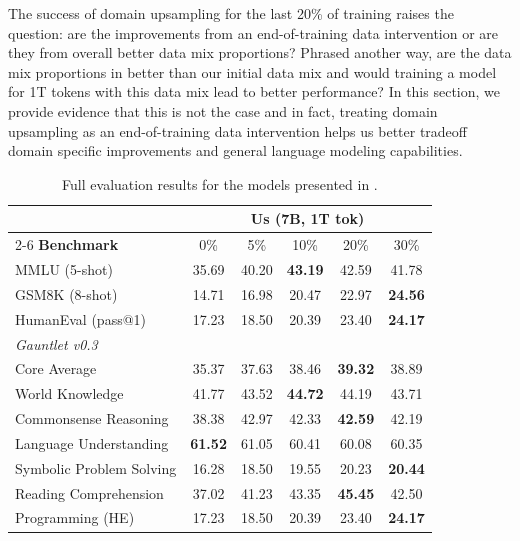 \documentclass[10pt]{article} %
\begin{document}
The success of domain upsampling for the last 20\% of training raises the question: are the improvements from an end-of-training data intervention or are they from overall better data mix proportions?
Phrased another way, are the data mix proportions in  better than our initial data mix and would training a model for 1T tokens with this data mix lead to better performance?
In this section, we provide evidence that this is not the case and in fact, treating domain upsampling as an end-of-training data intervention helps us better tradeoff domain specific improvements and general language modeling capabilities.

\begin{table}[!h]
    \centering
    \begin{tabular}{l c c c c c} \toprule 
         &  \multicolumn{5}{c}{\textbf{Us} (7B, 1T tok)} \\
         \cmidrule(lr){2-6}
         \textbf{Benchmark}  & 0\% &  5\% & 10\% & 20\% & 30\%  \\ \midrule 
         MMLU (5-shot)  & 35.69 & 40.20 & {\bf \color{c2} 43.19} & 42.59 & 41.78  \\
         GSM8K (8-shot) & 14.71 & 16.98 & 20.47 & 22.97 & {\bf \color{c2} 24.56}  \\
         HumanEval (pass@1) & 17.23 & 18.50 & 20.39 & 23.40 & {\bf \color{c2} 24.17} \\
         \midrule
         \textit{Gauntlet v0.3} \\
         \quad Core Average & 35.37 & 37.63 & 38.46 & {\bf \color{c2} 39.32} & 38.89             \\
         \quad World Knowledge          & 41.77 & 43.52 & {\bf \color{c2} 44.72} & 44.19 & 43.71  \\
         \quad Commonsense Reasoning    & 38.38 & 42.97 & 42.33 & {\bf \color{c2} 42.59} & 42.19   \\
         \quad Language Understanding   & {\bf \color{c2} 61.52} & 61.05 & 60.41 & 60.08 & 60.35  \\
         \quad Symbolic Problem Solving & 16.28 & 18.50 & 19.55 & 20.23 & {\bf \color{c2} 20.44}  \\
         \quad Reading Comprehension    & 37.02 & 41.23 & 43.35 & {\bf \color{c2} 45.45} & 42.50  \\
         \quad Programming (HE) & 17.23 & 18.50 & 20.39 & 23.40 & {\bf \color{c2} 24.17} \\
         \bottomrule
    \end{tabular}
    \caption{Full evaluation results for the models presented in .}
    \label{tab:cl-model-eval-dur}
\end{table}
\end{document}
